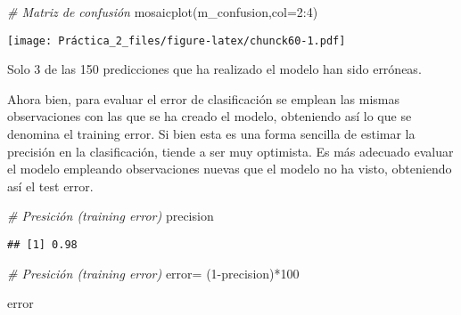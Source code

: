 \documentclass[
]{article}
\newenvironment{Shaded}{\begin{snugshade}}{\end{snugshade}}
\newcommand{\AttributeTok}[1]{\textcolor[rgb]{0.77,0.63,0.00}{#1}}
\newcommand{\CommentTok}[1]{\textcolor[rgb]{0.56,0.35,0.01}{\textit{#1}}}
\newcommand{\DecValTok}[1]{\textcolor[rgb]{0.00,0.00,0.81}{#1}}
\newcommand{\FunctionTok}[1]{\textcolor[rgb]{0.00,0.00,0.00}{#1}}
\newcommand{\NormalTok}[1]{#1}
\newcommand{\OtherTok}[1]{\textcolor[rgb]{0.56,0.35,0.01}{#1}}
\newcommand{\SpecialCharTok}[1]{\textcolor[rgb]{0.00,0.00,0.00}{#1}}
\begin{document}
\begin{Shaded}
\begin{Highlighting}[]
\CommentTok{\# Matriz de confusión}
\FunctionTok{mosaicplot}\NormalTok{(m\_confusion,}\AttributeTok{col=}\DecValTok{2}\SpecialCharTok{:}\DecValTok{4}\NormalTok{)}
\end{Highlighting}
\end{Shaded}

\texttt{[image: Práctica\_2\_files/figure-latex/chunck60-1.pdf]}

Solo 3 de las 150 predicciones que ha realizado el modelo han sido
erróneas.

Ahora bien, para evaluar el error de clasificación se emplean las mismas
observaciones con las que se ha creado el modelo, obteniendo así lo que
se denomina el training error. Si bien esta es una forma sencilla de
estimar la precisión en la clasificación, tiende a ser muy optimista. Es
más adecuado evaluar el modelo empleando observaciones nuevas que el
modelo no ha visto, obteniendo así el test error.

\begin{Shaded}
\end{Shaded}

\begin{Shaded}
\begin{Highlighting}[]
\CommentTok{\# Presición (training error)}
\NormalTok{precision}
\end{Highlighting}
\end{Shaded}

\begin{verbatim}
## [1] 0.98
\end{verbatim}

\begin{Shaded}
\begin{Highlighting}[]
\CommentTok{\# Presición (training error)}
\NormalTok{error}\OtherTok{=}\NormalTok{ (}\DecValTok{1}\SpecialCharTok{{-}}\NormalTok{precision)}\SpecialCharTok{*}\DecValTok{100}
\end{Highlighting}
\end{Shaded}

\begin{Shaded}
\begin{Highlighting}[]
\NormalTok{error}
\end{Highlighting}
\end{Shaded}
\end{document}
